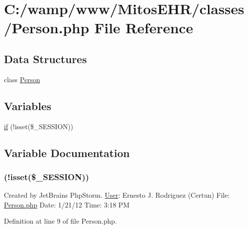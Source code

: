 \hypertarget{_person_8php}{\section{\-C\-:/wamp/www/\-Mitos\-E\-H\-R/classes/\-Person.php \-File \-Reference}
\label{_person_8php}
}
\subsection*{\-Data \-Structures}
\begin{DoxyCompactItemize}
\item 
class \hyperlink{class_person}{\-Person}
\end{DoxyCompactItemize}
\subsection*{\-Variables}
\begin{DoxyCompactItemize}
\item 
\hyperlink{_person_8php_a8ceca98aa29914fd2479a84a8d2242fb}{if} (!isset(\$\-\_\-\-S\-E\-S\-S\-I\-O\-N))
\end{DoxyCompactItemize}


\subsection{\-Variable \-Documentation}
\hypertarget{_person_8php_a8ceca98aa29914fd2479a84a8d2242fb}{
\subsubsection[{if}]{(!isset(\$\-\_\-\-S\-E\-S\-S\-I\-O\-N))}}\label{_person_8php_a8ceca98aa29914fd2479a84a8d2242fb}
\-Created by \-Jet\-Brains \-Php\-Storm. \hyperlink{class_user}{\-User}\-: \-Ernesto \-J. \-Rodriguez (\-Certun) \-File\-: \hyperlink{_person_8php}{\-Person.\-php} \-Date\-: 1/21/12 \-Time\-: 3\-:18 \-P\-M 

\-Definition at line 9 of file \-Person.\-php.

